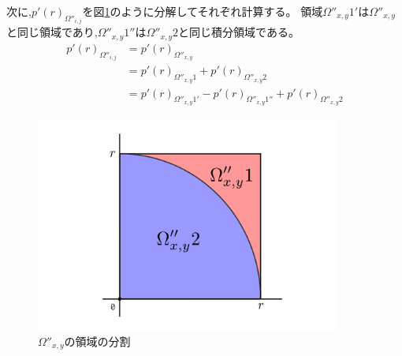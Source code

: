 次に,$p'(r)_{\Omega''_{i,j}}$を図\ref{fig:omega}のように分解してそれぞれ計算する。
領域$\Omega''_{x, y}1'$は$\Omega''_{x,y}$と同じ領域であり,$\Omega''_{x, y}1''$は$\Omega''_{x,y}2$と同じ積分領域である。
\begin{align}
p'(r)_{\Omega''_{i,j}} &= p'(r)_{\Omega''_{x, y}}\nonumber \\
&= p'(r)_{\Omega''_{x, y}1}  +p'(r)_{\Omega''_{x, y}2}\nonumber \\
&= p'(r)_{\Omega''_{x, y}1'} - p'(r)_{\Omega''_{x, y}1''} + p'(r)_{\Omega''_{x, y}2}
\end{align}
\begin{figure}[H]
    \begin{center}
        \includegraphics[width=10cm]{../img/omega_xy_1.png}
        \caption{$\Omega''_{x, y}$の領域の分割}
        \label{fig:omega}
    \end{center}
\end{figure}


